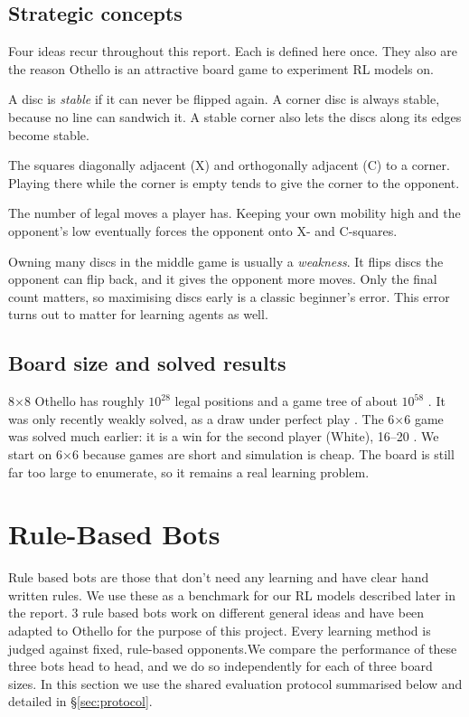 \documentclass[11pt]{article}
\newcommand{\bx}[1]{#1$\times$#1}
\begin{document}
\subsection{Strategic concepts}
\label{sec:concepts}
Four ideas recur throughout this report. Each is defined here once. They also are the reason Othello is an attractive board game to experiment RL models on. 
\begin{description}[leftmargin=1.2em,style=nextline]
  \item[Stability and corners.] A disc is \emph{stable} if it can never be
  flipped again. A corner disc is always stable, because no line can sandwich
  it. A stable corner also lets the discs along its edges become stable.
  \item[X- and C-squares.] The squares diagonally adjacent (X) and orthogonally
  adjacent (C) to a corner. Playing there while the corner is empty tends to
  give the corner to the opponent.
  \item[Mobility.] The number of legal moves a player has. Keeping your own
  mobility high and the opponent's low eventually forces the opponent onto
  X- and C-squares.
  \item[The disc-count trap.] Owning many discs in the middle game is usually a
  \emph{weakness}. It flips discs the opponent can flip back, and it gives the
  opponent more moves. Only the final count matters, so maximising discs early
  is a classic beginner's error. This error turns out to matter for learning
  agents as well.
\end{description}

\subsection{Board size and solved results}
\bx{8} Othello has roughly $10^{28}$ legal positions and a game tree of about
$10^{58}$ \cite{allis1994}. It was only recently weakly solved, as a draw under
perfect play \cite{takizawa2023}. The \bx{6} game was solved much earlier: it is a
win for the second player (White), 16--20 \cite{feinstein1993}. We start on \bx{6}
because games are short and simulation is cheap. The board is still far too
large to enumerate, so it remains a real learning problem.

\section{Rule-Based Bots}
\label{sec:bots}
Rule based bots are those that don't need any learning and have clear hand written rules. We use these as a benchmark for our RL models described later in the report. 3 rule based bots work on different general ideas and have been adapted to Othello for the purpose of this project.
Every learning method is judged against fixed, rule-based opponents.We compare the performance of these three bots head to head, and we do so independently for each of three board sizes.
In this section we use the shared evaluation protocol summarised below and
detailed in \S\ref{sec:protocol}.
\end{document}
